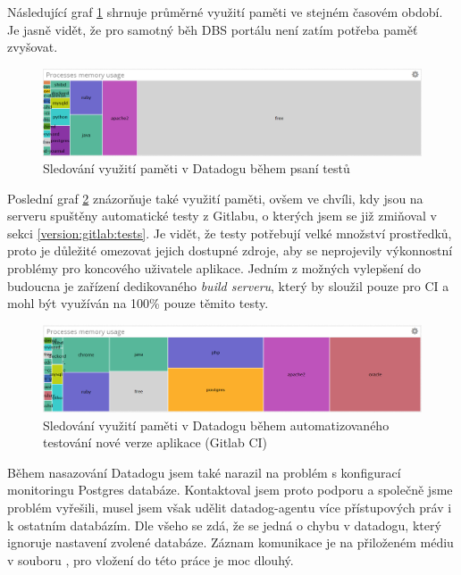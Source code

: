 Následující graf \ref{picture:datadog-memory-normal} shrnuje průměrné využití paměti ve stejném časovém období. Je jasně vidět, že pro samotný běh DBS portálu není zatím potřeba paměť zvyšovat.\\
\begin{figure}[H]
\includegraphics[width=\textwidth]{../png/datadog-memory-normal.png}
\caption{Sledování využití paměti v Datadogu během psaní testů} \label{picture:datadog-memory-normal}
\end{figure}
Poslední graf \ref{picture:datadog-memory-tests} znázorňuje také využití paměti, ovšem ve chvíli, kdy jsou na serveru spuštěny automatické testy z Gitlabu, o kterých jsem se již zmiňoval v sekci \ref{version:gitlab:tests}. Je vidět, že testy potřebují velké množství prostředků, proto je důležité omezovat jejich dostupné zdroje, aby se neprojevily výkonnostní problémy pro koncového uživatele aplikace. Jedním z možných vylepšení do budoucna je zařízení dedikovaného \emph{build serveru}, který by sloužil pouze pro CI a mohl být využíván na 100\% pouze těmito testy.
\begin{figure}[H]
\includegraphics[width=\textwidth]{../png/datadog-memory-tests.png}
\caption{Sledování využití paměti v Datadogu během automatizovaného testování nové verze aplikace (Gitlab CI)} \label{picture:datadog-memory-tests}
\end{figure}

Během nasazování Datadogu jsem také narazil na problém s konfigurací monitoringu Postgres databáze. Kontaktoval jsem proto podporu a společně jsme problém vyřešili, musel jsem však udělit datadog-agentu více přístupových práv i k ostatním databázím. Dle všeho se zdá, že se jedná o chybu v datadogu, který ignoruje nastavení zvolené databáze. Záznam komunikace je na přiloženém médiu v souboru , pro vložení do této práce je moc dlouhý.

